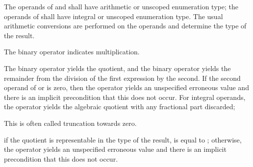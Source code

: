 \pnum
The operands of \tcode{*} and \tcode{/} shall have arithmetic or unscoped
enumeration type; the operands of \tcode{\%} shall have integral or unscoped
enumeration type. The usual arithmetic conversions are performed on the
operands and determine the type of the result.

\pnum
The binary \tcode{*} operator indicates multiplication.

\pnum
The binary \tcode{/} operator yields the quotient, and the binary
\tcode{\%} operator yields the remainder from the division of the first
expression by the second.
%
If the second operand of
\tcode{/} or \tcode{\%}
is zero,
then the operator yields an unspecified erroneous value
and there is an implicit precondition that
this does not occur.
%
%
%
%
%
For integral operands, the \tcode{/} operator yields the algebraic quotient with
any fractional part discarded;
\begin{footnote}
This is often called truncation towards zero.
\end{footnote}
if the quotient  is representable in the type of the result,
 is equal to ; otherwise,
the operator yields an unspecified erroneous value
and there is an implicit precondition that
this does not occur.
